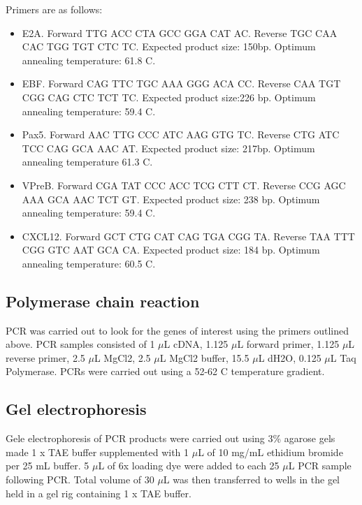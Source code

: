 Primers are as follows:
\begin{itemize}
\item E2A. Forward TTG ACC CTA GCC GGA CAT AC.
Reverse TGC CAA CAC TGG TGT CTC TC.
Expected product size: 150bp.
Optimum annealing temperature: 61.8 \textdegree C.

\item EBF.
Forward CAG TTC TGC AAA GGG ACA CC.
Reverse CAA TGT CGG CAG CTC TCT TC.
Expected product size:226 bp.
Optimum annealing temperature: 59.4 \textdegree C.

\item Pax5. Forward AAC TTG CCC ATC AAG GTG TC.
Reverse CTG ATC TCC CAG GCA AAC AT.
Expected product size: 217bp.
Optimum annealing temperature 61.3 \textdegree C.

\item VPreB.
Forward CGA TAT CCC ACC TCG CTT CT.
Reverse CCG AGC AAA GCA AAC TCT GT.
Expected product size: 238 bp.
Optimum annealing temperature: 59.4 \textdegree C.

\item CXCL12.
Forward GCT CTG CAT CAG TGA CGG TA.
Reverse TAA TTT CGG GTC AAT GCA CA.
Expected product size: 184 bp.
Optimum annealing temperature: 60.5 \textdegree C.
\end{itemize}

\subsection{Polymerase chain reaction}

PCR was carried out to look for the genes of interest using the primers outlined above.
PCR samples consisted of 1 $\mu$L cDNA, 1.125 $\mu$L forward primer, 1.125 $\mu$L reverse primer, 2.5 $\mu$L MgCl{2}, 2.5 $\mu$L MgCl{2} buffer, 15.5 $\mu$L dH{2}O, 0.125 $\mu$L Taq Polymerase.
PCRs were carried out using a 52-62 \textdegree C temperature gradient.

\subsection{Gel electrophoresis}

Gele electrophoresis of PCR products were carried out using 3\% agarose gels made 1 x TAE buffer supplemented with 1 $\mu$L of 10 mg/mL ethidium bromide per 25 mL buffer.
5 $\mu$L of 6x loading dye were added to each 25 $\mu$L PCR sample following PCR.
Total volume of 30 $\mu$L was then transferred to wells in the gel held in a gel rig containing 1 x TAE buffer.

